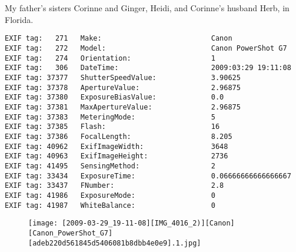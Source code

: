 \section{\protect{}}
\noindent My father's sisters Corinne and Ginger, Heidi, and Corinne's husband Herb, in Florida.
\noindent
\begin{lstlisting}
EXIF tag:   271   Make:                          Canon
EXIF tag:   272   Model:                         Canon PowerShot G7
EXIF tag:   274   Orientation:                   1
EXIF tag:   306   DateTime:                      2009:03:29 19:11:08
EXIF tag: 37377   ShutterSpeedValue:             3.90625
EXIF tag: 37378   ApertureValue:                 2.96875
EXIF tag: 37380   ExposureBiasValue:             0.0
EXIF tag: 37381   MaxApertureValue:              2.96875
EXIF tag: 37383   MeteringMode:                  5
EXIF tag: 37385   Flash:                         16
EXIF tag: 37386   FocalLength:                   8.205
EXIF tag: 40962   ExifImageWidth:                3648
EXIF tag: 40963   ExifImageHeight:               2736
EXIF tag: 41495   SensingMethod:                 2
EXIF tag: 33434   ExposureTime:                  0.06666666666666667
EXIF tag: 33437   FNumber:                       2.8
EXIF tag: 41986   ExposureMode:                  0
EXIF tag: 41987   WhiteBalance:                  0

\end{lstlisting}
\clearpage
\begin{figure}
\raggedleft
\texttt{[image: [2009-03-29\_19-11-08][IMG\_4016\_2)][Canon][Canon\_PowerShot\_G7][adeb220d561845d5406081b8dbb4e0e9].1.jpg]}
\end{figure}


\clearpage
